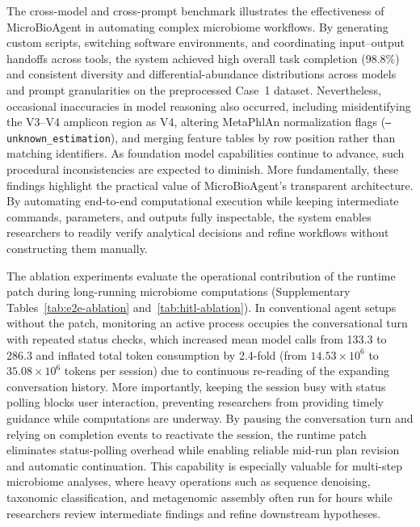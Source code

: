 \documentclass[10pt,letterpaper]{article}
\begin{document}
The cross-model and cross-prompt benchmark illustrates the effectiveness of
MicroBioAgent in automating complex microbiome workflows.  By generating custom
scripts, switching software environments, and coordinating input--output
handoffs across tools, the system achieved high overall task completion (98.8\%)
and consistent diversity and differential-abundance distributions across
models and prompt granularities on the preprocessed Case~1 dataset.
Nevertheless, occasional inaccuracies in model reasoning also occurred,
including misidentifying the V3--V4 amplicon region as V4, altering MetaPhlAn
normalization flags (\texttt{--unknown\_estimation}), and merging feature
tables by row position rather than matching identifiers.  As foundation model
capabilities continue to advance, such procedural inconsistencies are expected
to diminish.  More fundamentally, these findings highlight the practical value
of MicroBioAgent's transparent architecture.  By automating end-to-end
computational execution while keeping intermediate commands, parameters, and
outputs fully inspectable, the system enables researchers to readily verify
analytical decisions and refine workflows without constructing them manually.

The ablation experiments evaluate the operational contribution of the runtime
patch during long-running microbiome computations (Supplementary Tables~\ref{tab:e2e-ablation} and~\ref{tab:hitl-ablation}).
In conventional agent setups without the patch, monitoring an active process
occupies the conversational turn with repeated status checks, which increased
mean model calls from 133.3 to 286.3 and inflated total token consumption by
2.4-fold (from $14.53 \times 10^6$ to $35.08 \times 10^6$ tokens per session)
due to continuous re-reading of the expanding conversation history.  More
importantly, keeping the session busy with status polling blocks user
interaction, preventing researchers from providing timely guidance while
computations are underway. By
pausing the conversation turn and relying on completion events to reactivate
the session, the runtime patch eliminates status-polling overhead while
enabling reliable mid-run plan revision and automatic continuation.  
This capability is especially valuable for
multi-step microbiome analyses, where heavy operations such as sequence
denoising, taxonomic classification, and metagenomic assembly often run for
hours while researchers review intermediate findings and refine downstream
hypotheses.
\end{document}
